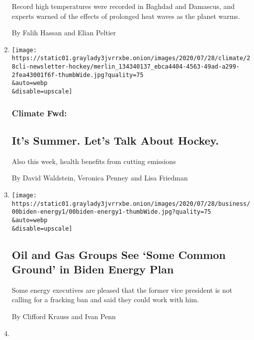 \begin{enumerate}
  Record high temperatures were recorded in Baghdad and Damascus, and
  experts warned of the effects of prolonged heat waves as the planet
  warms.

  By Falih Hassan and Elian Peltier
\item
  \href{/2020/07/29/climate/skating-hockey-climate-change.html}{}

  \texttt{[image: https://static01.graylady3jvrrxbe.onion/images/2020/07/28/climate/28cli-newsletter-hockey/merlin\_134340137\_ebca4404-4563-49ad-a299-2fea43001f6f-thumbWide.jpg?quality=75\\\&auto=webp\\\&disable=upscale]}

  \hypertarget{climate-fwd}{%
  \subsubsection{Climate Fwd:}\label{climate-fwd}}

  \hypertarget{its-summer-lets-talk-about-hockey}{%
  \subsection{It's Summer. Let's Talk About
  Hockey.}\label{its-summer-lets-talk-about-hockey}}

  Also this week, health benefits from cutting emissions

  By David Waldstein, Veronica Penney and Lisa Friedman
\item
  \href{/2020/07/28/business/energy-environment/joe-biden-oil-gas-energy.html}{}

  \texttt{[image: https://static01.graylady3jvrrxbe.onion/images/2020/07/28/business/00biden-energy1/00biden-energy1-thumbWide.jpg?quality=75\\\&auto=webp\\\&disable=upscale]}

  \hypertarget{oil-and-gas-groups-see-some-common-ground-in-biden-energy-plan}{%
  \subsection{Oil and Gas Groups See `Some Common Ground' in Biden
  Energy
  Plan}\label{oil-and-gas-groups-see-some-common-ground-in-biden-energy-plan}}

  Some energy executives are pleased that the former vice president is
  not calling for a fracking ban and said they could work with him.

  By Clifford Krauss and Ivan Penn
\item
  \href{/2020/07/28/world/europe/france-heated-terraces-coronavirus.html}{}


\end{enumerate}
